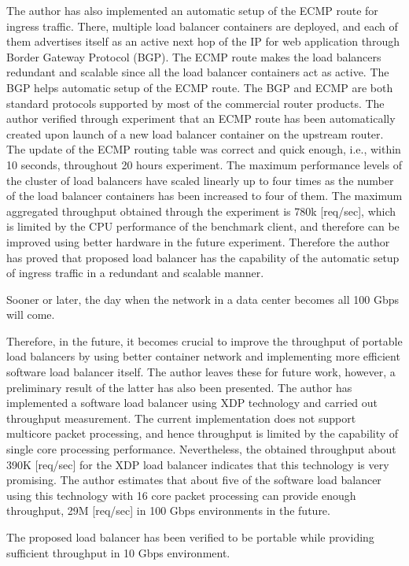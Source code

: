 The author has also implemented an automatic setup of the ECMP route for ingress traffic.
There, multiple load balancer containers are deployed, and each of them advertises itself as an active next hop of the IP for web application through Border Gateway Protocol (BGP).
The ECMP route makes the load balancers redundant and scalable since all the load balancer containers act as active.
%
The BGP helps automatic setup of the ECMP route.  
The BGP and ECMP are both standard protocols supported by most of the commercial router products.
%
The author verified through experiment that an ECMP route has been automatically created upon launch of a new load balancer container on the upstream router.
The update of the ECMP routing table was correct and quick enough, i.e., within 10 seconds, throughout 20 hours experiment.
The maximum performance levels of the cluster of load balancers have scaled linearly up to four times as the number of the load balancer containers has been increased to four of them.
The maximum aggregated throughput obtained through the experiment is 780k [req/sec], which is limited by the CPU performance of the benchmark client, and therefore can be improved using better hardware in the future experiment.
Therefore the author has proved that proposed load balancer has the capability of the automatic setup of ingress traffic in a redundant and scalable manner.
%




Sooner or later, the day when the network in a data center becomes all 100 Gbps will come.

Therefore, in the future, it becomes crucial to improve the throughput of portable load balancers by using better container network and implementing more efficient software load balancer itself.
The author leaves these for future work, however, a preliminary result of the latter has also been presented.
The author has implemented a software load balancer using XDP technology and carried out throughput measurement.
The current implementation does not support multicore packet processing, and hence throughput is limited by the capability of single core processing performance.
Nevertheless, the obtained throughput about 390K [req/sec] for the XDP load balancer indicates that this technology is very promising.
The author estimates that about five of the software load balancer using this technology with 16 core packet processing can provide enough throughput, 29M [req/sec] in 100 Gbps environments in the future. 

The proposed load balancer has been verified to be portable while providing sufficient throughput in 10 Gbps environment.


